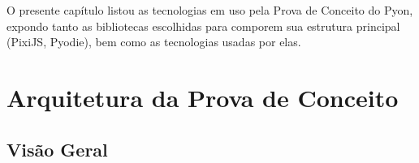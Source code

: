 \begin{apendicesenv}
O presente capítulo listou as tecnologias em uso pela Prova de Conceito do Pyon, expondo tanto as bibliotecas
escolhidas para comporem sua estrutura principal (PixiJS, Pyodie), bem como as tecnologias usadas por elas.

%
%

\chapter[Arquitetura da Prova de Conceito]{Arquitetura da Prova de Conceito}
\label{apendice:arquitetura_poc}

\section{Visão Geral}


\end{apendicesenv}
